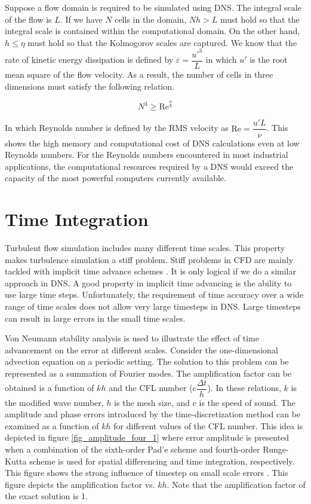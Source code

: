 \documentclass[12pt,oneside,a4paper,english]{article}
\begin{document}
Suppose a flow domain is required to be simulated using DNS. The integral scale of the flow is $L$. If we have $N$ cells in the domain, $Nh>L$ must hold so that the integral scale is contained within the computational domain. On the other hand, $h \leq \eta$ must hold so that the Kolmogorov scales are captured. We know that the rate of kinetic energy dissipation is defined by $\varepsilon = \dfrac{u'^3}{L}$ in which $u'$ is the root mean square of the flow velocity. As a result, the number of cells in three dimensions must satisfy the following relation.

\begin{equation}
N^3 \geq \text{Re}^{\frac{9}{4}}
\end{equation}

In which Reynolds number is defined by the RMS velocity as $\text{Re}=\dfrac{u' L}{\nu}$. This shows the high memory and computational cost of DNS calculations even at low Reynolds numbers. For the Reynolds numbers encountered in most industrial applications, the computational resources required by a DNS would exceed the capacity of the most powerful computers currently available.







\section{Time Integration}
Turbulent flow simulation includes many different time scales. This property makes turbulence simulation a stiff problem. Stiff problems in CFD are mainly tackled with implicit time advance schemes \cite{BAKER416}. It is only logical if we do a similar approach in DNS. A good property in implicit time advancing is the ability to use large time steps. Unfortunately, the requirement of time accuracy over a wide range of time scales does not allow very large timesteps in DNS. Large timesteps can result in large errors in the small time scales.

Von Neumann stability analysis is used to illustrate the effect of time advancement on the error at different scales. Consider the one-dimensional advection equation on a periodic setting. The solution to this problem can be represented as a summation of Fourier modes. The amplification factor can be obtained is a function of $kh$ and the CFL number ($c\dfrac{\Delta t}{h}$). In these relations, $k$ is the modified wave number, $h$ is the mesh size, and $c$ is the speed of sound. The amplitude and phase errors introduced by the time-discretization method can be examined as a function of $kh$ for different values of the CFL number. This idea is depicted in figure \ref{fig_amplitude_four_1} where error amplitude is presented when a combination of the sixth-order Pad'e scheme and fourth-order Runge-Kutta scheme is used for spatial differencing and time integration, respectively. This figure shows the strong influence of timestep on small scale errors \cite{Kardashian1998}. This figure depicts the amplification factor vs. $kh$. Note that the amplification factor of the exact solution is 1.
\end{document}
